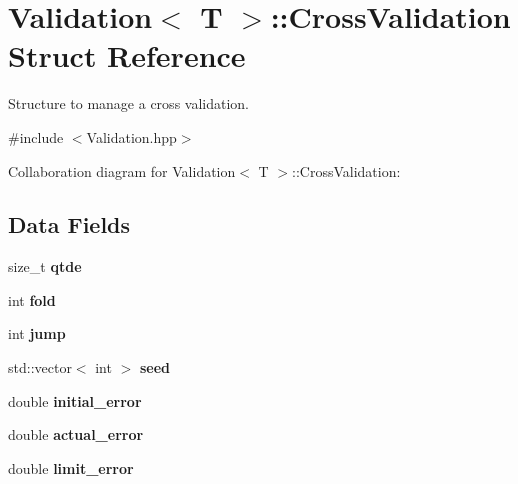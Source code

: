 \hypertarget{struct_validation_1_1_cross_validation}{}\section{Validation$<$ T $>$\+:\+:Cross\+Validation Struct Reference}
\label{struct_validation_1_1_cross_validation}


Structure to manage a cross validation.  




{\ttfamily \#include $<$Validation.\+hpp$>$}



Collaboration diagram for Validation$<$ T $>$\+:\+:Cross\+Validation\+:
\subsection*{Data Fields}
\begin{DoxyCompactItemize}
\item 
\mbox{\label{struct_validation_1_1_cross_validation_a1390b0775383e95347b9d502376b028a}} 
size\+\_\+t {\bfseries qtde}
\item 
\mbox{\label{struct_validation_1_1_cross_validation_a24522e62bed86b222427793059358453}} 
int {\bfseries fold}
\item 
\mbox{\label{struct_validation_1_1_cross_validation_aaa216ea500fc18c08d5b2b6ecfa2d6b5}} 
int {\bfseries jump}
\item 
\mbox{\label{struct_validation_1_1_cross_validation_a759a6c1c6ebce11575401fb0cc397e06}} 
std\+::vector$<$ int $>$ {\bfseries seed}
\item 
\mbox{\label{struct_validation_1_1_cross_validation_acdccfcf784001cd120096263fe27e03d}} 
double {\bfseries initial\+\_\+error}
\item 
\mbox{\label{struct_validation_1_1_cross_validation_a58b86e73f6085890ec4cf4b755bb5ab0}} 
double {\bfseries actual\+\_\+error}
\item 
\mbox{\label{struct_validation_1_1_cross_validation_af6298877a122a8e4bcd447277476677b}} 
double {\bfseries limit\+\_\+error}
\end{DoxyCompactItemize}


